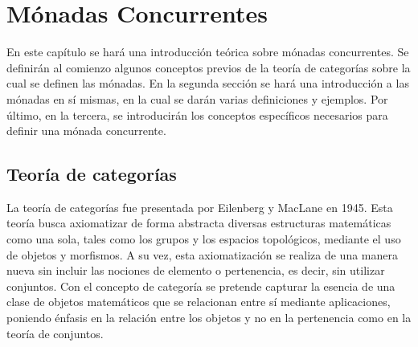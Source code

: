 \chapter{M\'onadas Concurrentes}\label{chapter:monconc}

En este capítulo se hará una introducción teórica sobre mónadas concurrentes. Se definirán al comienzo algunos conceptos previos de la teoría de categorías sobre la cual se definen las mónadas. En la segunda sección se hará una introducción a las mónadas en sí mismas, en la cual se darán varias definiciones y ejemplos. Por último, en la tercera, se introducirán los conceptos específicos necesarios para definir una mónada concurrente. 

\section{Teoría de categorías}\label{monconc:cat}

La teoría de categorías fue presentada por Eilenberg y MacLane \cite{eilenberg:1945} en 1945. Esta teoría busca axiomatizar de forma abstracta diversas estructuras matemáticas como una sola, tales como los grupos y los espacios topológicos, mediante el uso de objetos y morfismos. A su vez, esta axiomatización se realiza de una manera nueva sin incluir las nociones de elemento o pertenencia, es decir, sin utilizar conjuntos. Con el concepto de categoría se pretende capturar la esencia de una clase de objetos matemáticos que se relacionan entre sí mediante aplicaciones, poniendo énfasis en la relación entre los objetos y no en la pertenencia como en la teoría de conjuntos.

